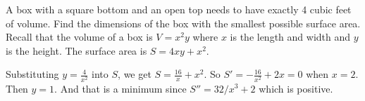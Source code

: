 \documentclass[12pt,answers]{exam}
\newcommand{\ds}{\displaystyle}
\begin{document}
\begin{questions}
\question A box with a square bottom and an open top needs to have exactly 4 cubic feet of volume.  Find the dimensions of the box with the smallest possible surface area.  Recall that the volume of a box is $V = x^2 y$ where $x$ is the length and width and $y$ is the height.  The surface area is $S = 4xy + x^2$.  
\begin{solution}
Substituting $y = \tfrac{4}{x^2}$ into $S$, we get $S = \tfrac{16}{x} + x^2$.  So $S' = -\tfrac{16}{x^2} + 2x = 0$ when $x = 2$. Then $y = 1$.  And that is a minimum since $S'' = 32/x^3 + 2$ which is positive.  



\end{solution}
\vfill
\vfill

\end{questions}

%
%
%
%
%
%
%
\end{document}
